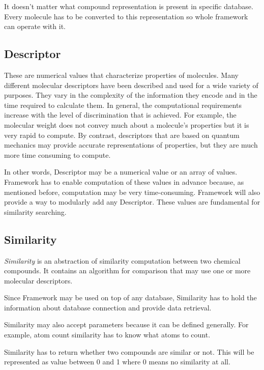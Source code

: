 \documentclass[thesis=M,english]{FITthesis}[2012/10/20]
\begin{document}
It doesn’t matter what compound representation is present in specific database. Every molecule has to be converted to this representation so whole framework can operate with it. 

\subsection{Descriptor}
These are numerical values that characterize properties of molecules. Many different molecular descriptors have been described and used for a wide variety of purposes. They vary in the complexity of the information they encode and in the time required to calculate them. In general, the computational requirements increase with the level of discrimination that is achieved. For example, the molecular weight does not convey much about a molecule’s properties but it is very rapid to compute. By contrast, descriptors that are based on quantum mechanics may provide accurate representations of properties, but they are much more time consuming to compute. \cite{intro}

In other words, Descriptor may be a numerical value or an array of values. Framework has to enable computation of these values in advance because, as mentioned before, computation may be very time-consuming. Framework will also provide a way to modularly add any Descriptor. These values are fundamental for similarity searching.

\subsection{Similarity}
\textit{Similarity} is an abstraction of similarity computation between two chemical compounds. It contains an algorithm for comparison that may use one or more molecular descriptors.

Since Framework may be used on top of any database, Similarity has to hold the information about database connection and provide data retrieval.

Similarity may also accept parameters because it can be defined generally. For example, atom count similarity has to know what atoms to count. 

Similarity has to return whether two compounds are similar or not. This will be represented as value between 0 and 1 where 0 means no similarity at all.
\end{document}
